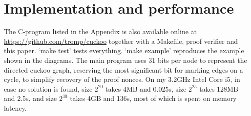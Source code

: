 \documentclass[11pt, oneside]{article}
\begin{document}
\section{Implementation and performance}
The C-program listed in the Appendix is also available online at
\url{https://github.com/tromp/cuckoo} together with a Makefile,
proof verifier and this paper. `make test' tests everything.
`make example' reproduces the example shown in the diagrams.
The main program uses 31 bits per node to represent the
directed cuckoo graph, reserving the most significant bit
for marking edges on a cycle, to simplify recovery of the proof nonces.
On my 3.2GHz Intel Core i5, in case no solution is found, size $2^{20}$ takes 4MB and 0.025s, size
$2^{25}$ takes 128MB and 2.5s, and size $2^{30}$ takes 4GB and 136s,
most of which is spent on memory latency.
\end{document}
